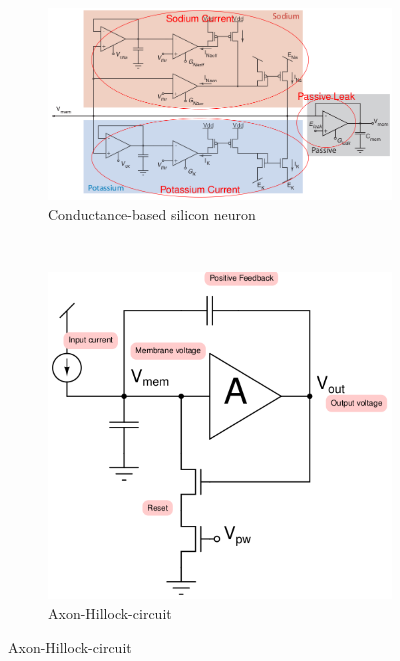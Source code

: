 \documentclass[a4paper, 12pt]{article}
\begin{document}
\begin{figure}[H]
	\centering
	\begin{subfigure}[b]{0.5\textwidth}
		\centering
		\includegraphics[width=\textwidth]{conductance-based-SI-neuron.png}
		\caption{Conductance-based silicon neuron}
	\end{subfigure}%
	~
	\begin{subfigure}[b]{0.5\textwidth}
		\centering
		\includegraphics[width=\textwidth]{axon-hillock-circuit.png}
		\caption{Axon-Hillock-circuit}
	\end{subfigure}
\end{figure}
\end{document}

